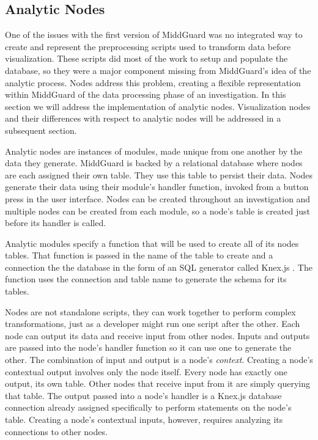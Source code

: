 \documentclass[midd]{thesis}
\begin{document}
\subsection{Analytic Nodes}

One of the issues with the first version of MiddGuard was no integrated way to
create and represent the preprocessing scripts used to transform data before
visualization. These scripts did most of the work to setup and populate the
database, so they were a major component missing from MiddGuard's idea of the
analytic process. Nodes address this problem, creating a flexible representation
within MiddGuard of the data processing phase of an investigation. In this
section we will address the implementation of analytic nodes. Visualization
nodes and their differences with respect to analytic nodes will be addressed in
a subsequent section.

Analytic nodes are instances of modules, made unique from one another by the
data they generate. MiddGuard is backed by a relational database where nodes are
each assigned their own table. They use this table to persist their data. Nodes
generate their data using their module's handler function, invoked from a button
press in the user interface. Nodes can be created throughout an investigation
and multiple nodes can be created from each module, so a node's table is created
just before its handler is called.

Analytic modules specify a function that will be used to create all of its nodes
tables. That function is passed in the name of the table to create and a
connection the the database in the form of an SQL generator called Knex.js
\cite{knexjs}. The function uses the connection and table name to generate the
schema for its tables.

Nodes are not standalone scripts, they can work together to perform complex
transformations, just as a developer might run one script after the other. Each
node can output its data and receive input from other nodes. Inputs and outputs
are passed into the node's handler function so it can use one to generate the
other. The combination of input and output is a node's \textit{context}.
Creating a node's contextual output involves only the node itself. Every node
has exactly one output, its own table. Other nodes that receive input from it
are simply querying that table. The output passed into a node's handler is a
Knex.js database connection already assigned specifically to perform statements
on the node's table. Creating a node's contextual inputs, however, requires
analyzing its connections to other nodes.
\end{document}
